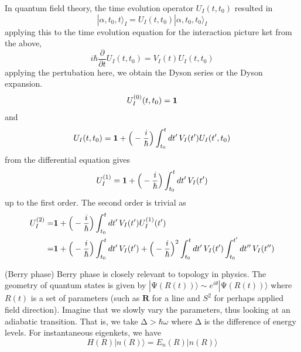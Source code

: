\begin{cor}
In quantum field theory, the time evolution operator $U_{I}(t,t_0)$ resulted in 
\[|\alpha ,t_0,t\rangle _{I}=U_{I}(t,t_0)|\alpha ,t_0,t_0\rangle _{I}\]
applying this to the time evolution equation for the interaction picture ket from the above,
\[i\hbar \dfrac{\partial }{\partial t}U_{I}(t,t_0)=V_{I}(t)U_{I}(t,t_0) \]
applying the pertubation here, we obtain the Dyson series or the Dyson expansion.
\[\begin{align*}
U^{(0)}_{I}(t,t_0)={\bf 1}
\end{align*}\]
and
\[\begin{align*}
U_{I}(t,t_0)={\bf 1}+\Big(-\dfrac{i}{\hbar }\Big)\int ^{t}_{t_0}dt'\,V_{I}(t')U_{I}(t',t_0)
\end{align*}\]
from the differential equation gives
\[U^{(1)}_{I}={\bf 1}+\Big(-\dfrac{i}{\hbar }\Big)\int ^{t}_{t_0}dt'\,V_{I}(t')\]
up to the first order. The second order is trivial as
\[\begin{align*}
U_{I}^{(2)}=&{\bf 1}+\Big(-\dfrac{i}{\hbar }\Big)\int ^{t}_{t_0}dt'\,V_{I}(t')U^{(1)}_{I}(t')\\=&{\bf 1}+\Big(-\dfrac{i}{\hbar }\Big)\int ^{t}_{t_0}dt'\,V_{I}(t')+\Big(-\dfrac{i}{\hbar }\Big)^2\int ^{t}_{t_0}dt'\,V_{I}(t')\int ^{t'}_{t_0}dt''\,V_{I}(t'')
\end{align*}\]
\end{cor}
\vspace{2ex}
\begin{defi}
(Berry phase) Berry phase is closely relevant to topology in physics. The geometry of quantum states is given by $|\mathrm{\Psi} (R(t))\rangle \sim  e^{i\theta }|\mathrm{\Psi} (R(t))\rangle $ where $R(t)$ is a set of parameters (such as ${\bm R}$ for a line and $S^2$ for perhaps applied field direction). Imagine that we slowly vary the parameters, thus looking at an adiabatic transition. That is, we take $\mathrm{\Delta } > \hbar \omega $ where $\mathrm{\Delta }$ is the difference of energy levels. For instantaneous eigenkets, we have
\[H(R)|n(R)\rangle =E_{n}(R)|n(R)\rangle \]

\end{defi}
\vspace{2ex}


